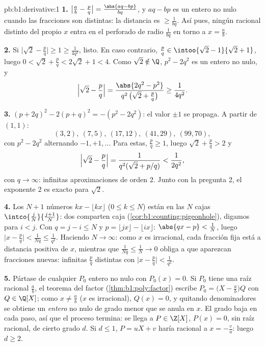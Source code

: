 \begin{solution}{pb:b1:derivative:1}
\textbf{1.} $\bigl|\frac ab - \frac pq\bigr| = \frac{\abs{aq -
bp}}{bq}$, y $aq - bp$ es un entero no nulo cuando las fracciones
son distintas: la distancia es $\geq \frac{1}{bq}$. Así pues, ningún
racional distinto del propio $x$ entra en el  perforado de
radio $\frac{1}{bq}$ en torno a $x = \frac ab$.

\textbf{2.} Si $\bigl|\sqrt2 - \frac pq\bigr| \geq 1 \geq
\frac{1}{4q^2}$, listo. En caso contrario,
$\frac pq \in \intoo{\sqrt2 - 1}{\sqrt2 + 1}$, luego
$0 < \sqrt2 + \frac pq < 2\sqrt2 + 1 < 4$. Como $\sqrt 2 \notin \Q$,
$p^2 - 2q^2$ es un entero no nulo, y
\[
\Bigl|\sqrt2 - \frac pq\Bigr|
= \frac{\abs{2q^2 - p^2}}{q^2\,\bigl(\sqrt2 + \frac pq\bigr)}
\geq \frac{1}{4q^2} .
\]

\textbf{3.} $(p + 2q)^2 - 2(p + q)^2 = -(p^2 - 2q^2)$: el valor
$\pm1$ se propaga. A partir de $(1,1)$:
\[
(3,2),\ (7,5),\ (17,12),\ (41,29),\ (99,70),
\]
con $p^2 - 2q^2$ alternando $-1, +1, \dots$
Para estas, $\frac pq \geq 1$, luego $\sqrt2 + \frac pq > 2$ y
\[
\Bigl|\sqrt2 - \frac pq\Bigr| =
\frac{1}{q^2(\sqrt2 + p/q)} < \frac{1}{2q^2} ,
\]
con $q \to \infty$: infinitas aproximaciones de orden $2$. Junto con
la pregunta 2, el exponente $2$ es exacto para $\sqrt 2$.

\textbf{4.} Los $N + 1$ números $kx - \lfloor kx\rfloor$
($0 \leq k \leq N$) están en las $N$ cajas
$\intco{\frac jN}{\frac{j+1}{N}}$: dos comparten caja
(\cref{cor:b1:counting:pigeonhole}), digamos para $i < j$. Con
$q = j - i \leq N$ y $p = \lfloor jx\rfloor - \lfloor ix\rfloor$:
$\abs{qx - p} < \frac1N$, luego
$\bigl|x - \frac pq\bigr| < \frac{1}{Nq} \leq \frac{1}{q^2}$.
Haciendo $N \to \infty$: como $x$ es irracional, cada fracción fija
está a distancia positiva de $x$, mientras que
$\frac{1}{Nq} \leq \frac 1N \to 0$ obliga a que aparezcan fracciones
nuevas: infinitas $\frac pq$ distintas con
$\bigl|x - \frac pq\bigr| < \frac{1}{q^2}$.

\textbf{5.} Pártase de cualquier $P_0$ entero no nulo con
$P_0(x) = 0$. Si $P_0$ tiene una raíz racional $\frac ab$, el teorema
del factor (\cref{thm:b1:poly:factor}) escribe
$P_0 = \bigl(X - \frac ab\bigr)Q$ con $Q \in \Q[X]$; como
$x \neq \frac ab$ ($x$ es irracional), $Q(x) = 0$, y quitando
denominadores se obtiene un  \emph{entero} no nulo de grado
menor que se anula en $x$. El grado baja en cada paso, así que el
proceso termina: se llega a $P \in \Z[X]$, $P(x) = 0$, sin raíz
racional, de cierto grado $d$. Si $d \leq 1$, $P = uX + v$ haría
racional a $x = -\frac vu$: luego $d \geq 2$.


\end{solution}
